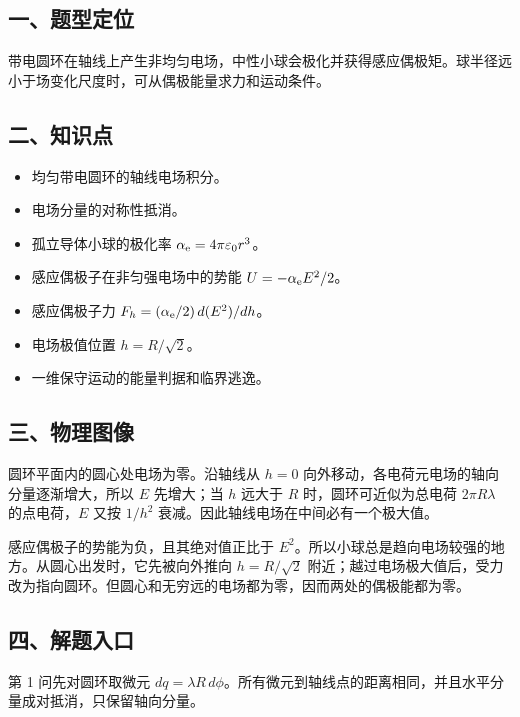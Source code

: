 \documentclass[12pt,a4paper,UTF8]{ctexart}
\newcommand{\tightlist}{\setlength{\itemsep}{0pt}\setlength{\parskip}{0pt}}
\begin{document}
\subsection{一、题型定位}\label{ux4e00ux9898ux578bux5b9aux4f4d-2}

带电圆环在轴线上产生非均匀电场，中性小球会极化并获得感应偶极矩。球半径远小于场变化尺度时，可从偶极能量求力和运动条件。

\subsection{二、知识点}\label{ux4e8cux77e5ux8bc6ux70b9-2}

\begin{itemize}
\tightlist
\item
  均匀带电圆环的轴线电场积分。
\item
  电场分量的对称性抵消。
\item
  孤立导体小球的极化率 \(\alpha_{\rm e}=4\pi\varepsilon_0r^3\)。
\item
  感应偶极子在非匀强电场中的势能 \(U=-\alpha_{\rm e}E^2/2\)。
\item
  感应偶极子力 \(F_h=(\alpha_{\rm e}/2)\,d(E^2)/dh\)。
\item
  电场极值位置 \(h=R/\sqrt2\)。
\item
  一维保守运动的能量判据和临界逃逸。
\end{itemize}

\subsection{三、物理图像}\label{ux4e09ux7269ux7406ux56feux50cf-2}

圆环平面内的圆心处电场为零。沿轴线从 \(h=0\)
向外移动，各电荷元电场的轴向分量逐渐增大，所以 \(E\) 先增大；当 \(h\)
远大于 \(R\) 时，圆环可近似为总电荷 \(2\pi R\lambda\) 的点电荷，\(E\)
又按 \(1/h^2\) 衰减。因此轴线电场在中间必有一个极大值。

感应偶极子的势能为负，且其绝对值正比于
\(E^2\)。所以小球总是趋向电场较强的地方。从圆心出发时，它先被向外推向
\(h=R/\sqrt2\)
附近；越过电场极大值后，受力改为指向圆环。但圆心和无穷远的电场都为零，因而两处的偶极能都为零。

\subsection{四、解题入口}\label{ux56dbux89e3ux9898ux5165ux53e3-2}

第 1 问先对圆环取微元
\(dq=\lambda R\,d\phi\)。所有微元到轴线点的距离相同，并且水平分量成对抵消，只保留轴向分量。
\end{document}
